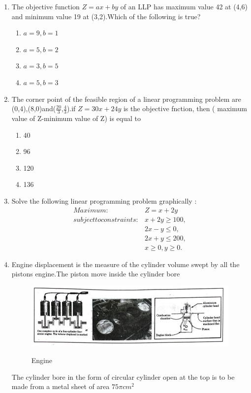 \documentclass{article}
\begin{document}
\begin{enumerate}
	\item The objective function $Z = ax+by$ of an LLP has maximum value 42 at (4,6) and minimum value 19 at (3,2).Which of the following is true?
		
  		\begin{enumerate}
				\item $a=9,b=1$
		        	\item $a=5,b=2$
				\item $a= 3,b=5$
				\item $a=5,b=3$
			
		\end{enumerate}
		
	\item The corner point of the feasible region of a linear programming problem are (0,4),(8,0)and($\frac{20}{3}$,$\frac{4}{3}$).if $ Z=30x+24y $ is the objective fnction, then ( maximum value of Z-minimum value of Z) is equal to 
		
		\begin{enumerate}
				\item 40
				\item 96
				\item 120
				\item 136
		\end{enumerate}
		
		
	\item 
	 Solve the following linear programming problem graphically :
\begin{align}
	Maximum:& Z=x+2y \nonumber \\
	subject to constraints 
	     :& x+2y\ge100,\nonumber\\
             & 2x-y\le0,\nonumber\\
	     & 2x+y\le200,\nonumber\\
   	     & x\ge0,y\ge0.\nonumber
\end{align}
				

			      \item
		Engine displacement is the measure of the cylinder volume swept by all the pistons engine.The piston move inside the cylinder bore \\
		
		\begin{figure}[htbp]
	\includegraphics[width=1 \columnwidth]{engine.jpg}\\
			\caption{Engine}
			\label{fig:pic}  \end{figure}
		The cylinder bore in the form of circular cylinder open at the top is to be made from a metal sheet of area $ 75 \pi cm^2 $ \\
 	

\end{enumerate}
\end{document}
